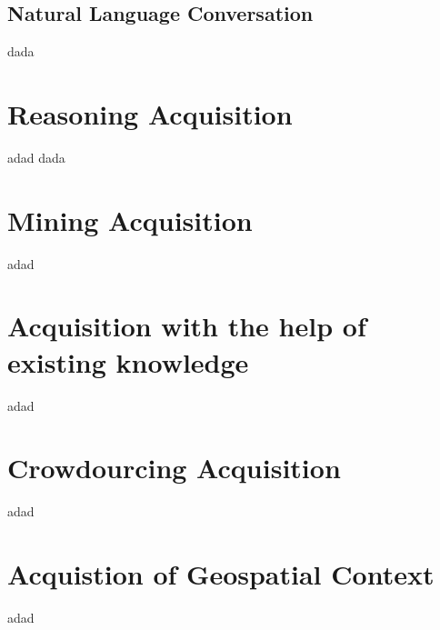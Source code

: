 \subsection{Natural Language Conversation}
dada

\section{Reasoning Acquisition}
adad dada

\section{Mining Acquisition}
adad

\section{Acquisition with the help of existing knowledge}
adad

\section{Crowdourcing Acquisition}
adad

\section{Acquistion of Geospatial Context}
adad
